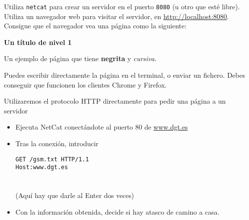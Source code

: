 \begin{homeworkProblem}

  Utiliza \texttt{netcat} para crear un servidor en el puerto \texttt{8080} (u otro que esté libre). Utiliza un navegador web para visitar el servidor, en \url{http://localhost:8080}. Consigue que el navegador vea una página como la siguiente:

  \begin{cuadrito}
    {\large \textbf{Un título de nivel 1}}
    
    Un ejemplo de página que tiene \textbf{negrita} y \textit{cursiva}.
  \end{cuadrito}

  Puedes escribir directamente la página en el terminal, o enviar un fichero. Debes conseguir que funcionen los clientes Chrome y Firefox.
  
\end{homeworkProblem}


\begin{homeworkProblem}
  Utilizaremos el protocolo HTTP directamente para pedir una página a un servidor
  \begin{itemize}
  \item Ejecuta NetCat conectándote al puerto 80 de \url{www.dgt.es}
  \item Tras la conexión, introducir
    \begin{cuadrito}
      \texttt{GET /gsm.txt HTTP/1.1} \\
      \texttt{Host:www.dgt.es} \\
      \\
      \\
      (Aquí hay que darle al Enter dos veces)
    \end{cuadrito}
  \item Con la información obtenida, decide si hay atasco de camino a casa.
  \end{itemize}
\end{homeworkProblem}





